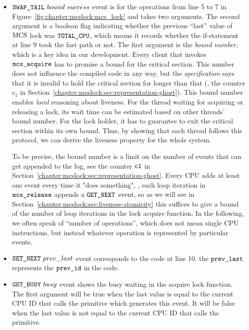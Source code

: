 \begin{itemize}

\item \textbf{${{\mathrm{\texttt{SWAP\_TAIL}}}~{bound}~{success}}$} event is for the
operations from line 5 to 7 in Figure~\ref{fig:chapter:mcslock:mcs_lock} and takes
two arguments. The second argument is a boolean flag indicating
whether the previous ``last'' value of $\mathrm{MCS}$ lock was ${\mathrm{\texttt{TOTAL\_CPU}}}$,
which means it records whether the if-statement at line 9 took the fast path or not.
The first argument is the \emph{bound number}, which is a key idea in
our development. Every client that invokes ${\mathrm{\texttt{mcs\_acquire}}}$ has
to promise a bound for the critical section. This number
does not influence the compiled code in any way, but the
\emph{specification} says that it is invalid to hold the critical
section for longer than that (\cf,  the counter $c_1$ in
Section~\ref{chapter:mcslock:sec:representation-ghost}).
This bound number enables \emph{local} reasoning about liveness.
For the thread waiting for acquiring or releasing a lock,
its wait time can be estimated based on other threads' bound number. For the lock holder, it has to guarantee
to exit the critical section within its own bound. 
Thus, by showing that each thread follows this protocol,
we can derive the liveness property for the whole system.

To be precise, the bound number is a limit on the number of events
that can get appended to the log, see the counter ${\mathrm{\texttt{c1}}}$ in
Section~\ref{chapter:mcslock:sec:representation-ghost}.
Every CPU adds at least
one event every time it "does something", \eg, each loop iteration in ${\mathrm{\texttt{mcs\_release}}}$ appends a ${\mathrm{\texttt{GET\_NEXT}}}$
event, so
as we will see in
Section~\ref{chapter:mcslock:sec:liveness-atomicity} this suffices to give a bound of the number of loop iterations in the lock acquire function. In the following, we often speak of
``number of operations'', which does not mean single CPU instructions,
but instead whatever operation is represented by particular events.



\item \textbf{${\mathrm{\texttt{SET\_NEXT}}}~{prev\_last}$} event corresponds to the code at line 10. 
the ${\mathrm{\texttt{prev\_last}}}$ represents the ${\mathrm{\texttt{prev\_id}}}$ in the code.

\item\textbf{${\mathrm{\texttt{GET\_BUSY}}}~{busy}$} event shows the busy waiting in the acquire lock function.
The first argument will be true when the last value is equal to the current CPU ID that calls the primitive which generates this event.
It will be false when the last value is not equal to the current CPU ID that calls the primitive.
\end{itemize}

